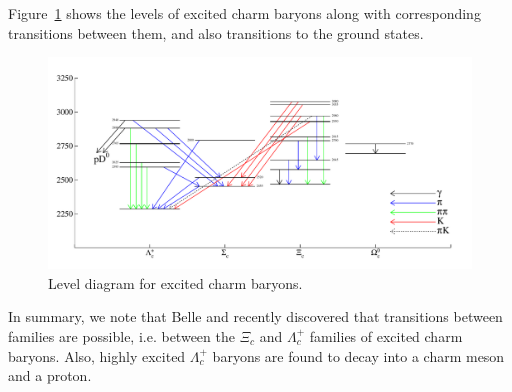  

Figure~\ref{charm:leveldiagram} shows the levels of excited charm
baryons along with corresponding transitions between them, and
also transitions to the ground states.
\begin{figure}[!htb]
\includegraphics[width=1.0\textwidth]{./figures/charm/charm_baryons2014.pdf}
\caption{Level diagram for excited charm baryons.}
\label{charm:leveldiagram}
\end{figure} 
In summary, we note that Belle and \babar  recently discovered
that transitions between families are possible, i.e. between the 
$\Xi_c$ and $\Lambda_c^+$ families of excited charm baryons. Also,
highly excited $\Lambda_c^+$ baryons are found to decay into 
a charm meson and a proton.    



